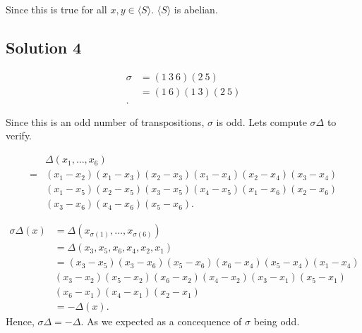 Since this is true for all \( x,y \in \langle S \rangle \). \( \langle S \rangle \) is abelian.



\subsection{Solution 4}
\begin{align*}
  \sigma &= \left( 1 \: 3 \: 6 \right) \left( 2 \: 5 \right) \\
  &= \left( 1 \: 6 \right) \left( 1 \: 3 \right) \left( 2 \: 5 \right) \\
.\end{align*}

Since this is an odd number of transpositions, \( \sigma  \) is odd. 
Lets compute \( \sigma \Delta\) to verify.

\begin{align*}
  & \Delta \left(x_{1}, \ldots,x_{6}  \right)  \\
  = &\left(x_{1} - x_{2}\right) \left( x_{1} - x_{3} \right) \left( x_{2} - x_{3} \right) \left( x_{1} - x_{4} \right) \left( x_{2} - x_{4} \right) \left( x_{3} - x_{4} \right) \\
    & \left( x_{1} - x_{5} \right) \left( x_{2} - x_{5}   \right) \left( x_{3} - x_{5} \right) \left( x_{4} - x_{5} \right) \left(x_{1} - x_{6}  \right) \left( x_{2} - x_{6} \right) \\
    & \left( x_{3} - x_{6} \right) \left( x_{4} - x_{6} \right) \left( x_{5} - x_{6} \right)
.\end{align*}

\begin{align*}
  \sigma \Delta \left( x \right) &= \Delta \left( x_{\sigma(1)}, \ldots, x_{\sigma(6)} \right) \\
  &= \Delta \left( x_{3}, x_{5}, x_{6}, x_{4}, x_{2}, x_{1}\right) \\
  &= \left(x_{3} - x_{5}\right) \left( x_{3} - x_{6} \right) \left( x_{5} - x_{6} \right) \left( x_{6} - x_{4} \right) \left( x_{5} - x_{4} \right) \left( x_{1} - x_{4} \right) \\
    & \left( x_{3} - x_{2} \right) \left( x_{5} - x_{2}   \right) \left( x_{6} - x_{2} \right) \left( x_{4} - x_{2} \right) \left(x_{3} - x_{1}  \right) \left( x_{5} - x_{1} \right) \\
    & \left( x_{6} - x_{1} \right) \left( x_{4} - x_{1} \right) \left( x_{2} - x_{1} \right) \\
  &= - \Delta  \left( x \right)
.\end{align*}
Hence, \( \sigma \Delta = - \Delta  \). As we expected as a concequence of \( \sigma  \) being odd.


